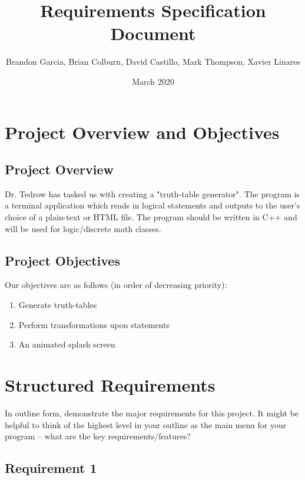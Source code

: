 \documentclass{article}
\title{Requirements Specification Document}
\author{Brandon Garcia, Brian Colburn, David Castillo, Mark Thompson, Xavier Linares}
\date{March 2020}
\begin{document}
\setlength{\parindent}{0pt}

\begin{titlingpage}
\maketitle
\end{titlingpage}

\tableofcontents
\pagebreak

\section{Project Overview and Objectives}
\subsection{Project Overview}
Dr. Tedrow has tasked us with creating a "truth-table generator". The program is a terminal application which reads in logical statements and outputs to the user's choice of a plain-text or HTML file. The program should be written in C++ and will be used for logic/discrete math classes.


\subsection{Project Objectives}

Our objectives are as follows (in order of decreasing priority):
\begin{enumerate}
 \item Generate truth-tables
 \item Perform transformations upon statements
 \tiny \item An animated splash screen
\end{enumerate}


\section{Structured Requirements}

In outline form, demonstrate the major requirements for this project. It might be helpful to think of the highest level in your outline as the main menu for your program -- what are the key requirements/features?

\subsection{Requirement 1}
\end{document}
